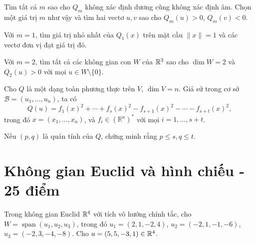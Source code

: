 ﻿\documentclass[12pt,a4paper]{article}
\DeclareMathOperator{\Span}{span}
\begin{document}
\begin{problem}[5 điểm]

Tìm tất cả $m$ sao cho $Q_m$ không xác định dương cũng không xác định âm. Chọn một giá trị $m$ như vậy và tìm hai vectơ $u,v$ sao cho $Q_m(u)>0$, $Q_m(v)<0$.

\end{problem}

\begin{problem}[3 điểm]

Với $m=1$, tìm giá trị nhỏ nhất của $Q_1(x)$ trên mặt cầu $\|x\|=1$ và các vectơ đơn vị đạt giá trị đó.

\end{problem}




\begin{problem}[4 điểm]
Với $m = 2$, tìm tất cả các không gian con $W$ của $\mathbb{R}^3$ sao cho $\dim W=2$ và $Q_2(u)>0$ với mọi $u\in W\setminus\{0\}$.
\end{problem}

\begin{problem}[4 điểm]
Cho \(Q\) là một dạng toàn phương thực trên \(V\), \(\dim V=n\). Giả sử trong cơ sở
\(\mathcal B=(u_1,\ldots,u_n)\),
ta có
\[
Q(u)
=
f_1(x)^2+\cdots+f_s(x)^2
-
f_{s+1}(x)^2-\cdots-f_{s+t}(x)^2,
\]
trong đó \(x=(x_1,\ldots,x_n)\), và \(f_i\in(\mathbb R^n)^*\) với mọi \(i=1,\ldots,s+t\).

Nếu \((p,q)\) là quán tính của \(Q\), chứng minh rằng
$
p\le s, q\le t.
$
\end{problem}

\section[Không gian Euclid và hình chiếu ]{Không gian Euclid và hình chiếu - 25 điểm}

Trong không gian Euclid $\mathbb{R}^4$ với tích vô hướng chính tắc, cho $W=\Span(u_1,u_2,u_3)$, trong đó $u_1=(2,1,-2,4)$, $u_2=(-2,1,-1,-6)$, $u_3=(-2,3,-4,-8)$. Cho $u=(5,5,-3,1)\in\mathbb{R}^4$.
\end{document}
